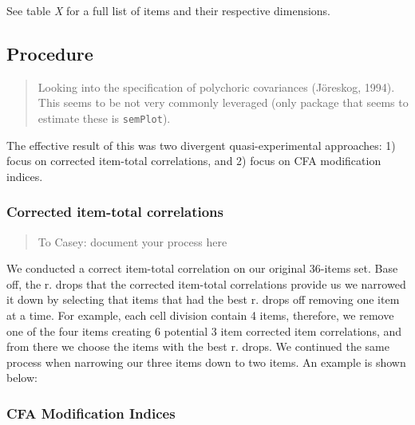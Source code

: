 \documentclass[
  english,
  man]{apa6}
\begin{document}
See table \emph{X} for a full list of items and their respective dimensions.

\hypertarget{procedure}{%
\subsection{Procedure}\label{procedure}}

\begin{quote}
Looking into the specification of polychoric covariances (Jöreskog, 1994). This seems to be not very commonly leveraged (only package that seems to estimate these is \texttt{semPlot}).
\end{quote}

The effective result of this was two divergent quasi-experimental approaches: 1) focus on corrected item-total correlations, and 2) focus on CFA modification indices.

\hypertarget{corrected-item-total-correlations}{%
\subsubsection{Corrected item-total correlations}\label{corrected-item-total-correlations}}

\begin{quote}
To Casey: document your process here
\end{quote}

We conducted a correct item-total correlation on our original 36-items set. Base off, the r. drops that the corrected item-total correlations provide us we narrowed it down by selecting that items that had the best r. drops off removing one item at a time. For example, each cell division contain 4 items, therefore, we remove one of the four items creating 6 potential 3 item corrected item correlations, and from there we choose the items with the best r. drops. We continued the same process when narrowing our three items down to two items. An example is shown below:

\hypertarget{cfa-modification-indices}{%
\subsubsection{CFA Modification Indices}\label{cfa-modification-indices}}
\end{document}

